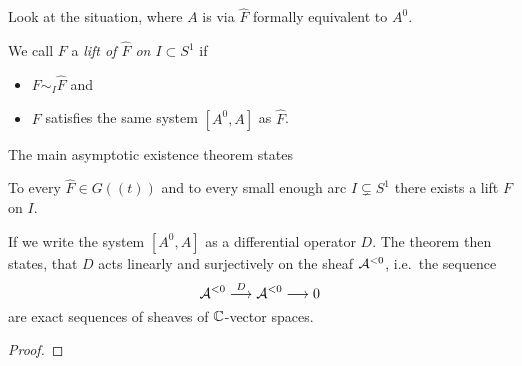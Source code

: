 Look at the situation, where $A$ is via $\hat F$ formally equivalent to $A^0$.

\begin{defn}
  We call $F$ a \emph{lift of $\hat F$ on $I\subset S^1$} if
  \begin{itemize}
    \item $F\sim_I\hat F$ and
    \item $F$ satisfies the same system $[A^0,A]$ as $\hat F$.
  \end{itemize}
\end{defn}
The main asymptotic existence theorem states
\begin{thm}[M.E.A.T]\label{thm:meat}
  To every $\hat F\in G(\!(t)\!)$ and to every small enough arc
  $I\subsetneq S^1$ there exists a lift $F$ on $I$.
  \begin{s-rem}
    If we write the system $[A^0,A]$ as a differential operator $D$.
    The theorem then states, that $D$ acts linearly and surjectively on the
    sheaf $\mathcal{A}^{<0}$, i.e.\ the sequence
    \[
      \mathcal{A}^{<0}\overset{D}\longrightarrow\mathcal{A}^{<0} \longrightarrow 0
    \]
    are exact sequences of sheaves of $\mathbb{C}$-vector spaces.
    \begin{comment}
      Proof in \textbf{[Mal91a, App 1; Thm 1]}
    \end{comment}
  \end{s-rem}
\end{thm}
\begin{proof}
  \TODO{}
\end{proof}

\begin{comment}
  \begin{rem}
    We are then able to find a \rewrite{(cyclic)} covering of the $S^1$ of
    arcs such that on every arc there exists a lift $\tilde F$ of $\hat F$.
  \end{rem}
\end{comment}
\TODO{}

